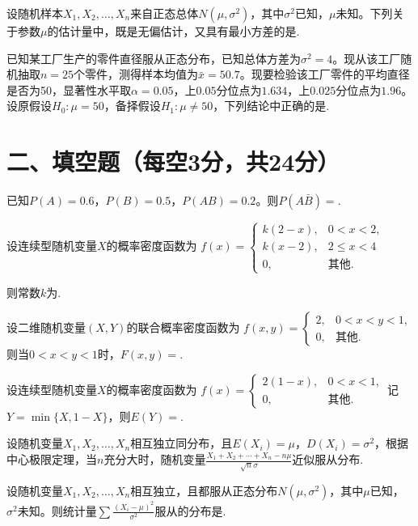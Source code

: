 \documentclass[answerspace=14]{shnu-exam}
\begin{document}
\question 设随机样本$X_1,X_2,\dots,X_n$来自正态总体$N(\mu,\sigma^2)$，其中$\sigma^2$已知，$\mu$未知。下列关于参数$\mu$的估计量中，既是无偏估计，又具有最小方差的是.

\question 已知某工厂生产的零件直径服从正态分布，已知总体方差为$\sigma^2=4$。现从该工厂随机抽取$n=25$个零件，测得样本均值为$\bar{x}=50.7$。现要检验该工厂零件的平均直径是否为50，显著性水平取$\alpha=0.05$，上$0.05$分位点为$1.634$，上$0.025$分位点为$1.96$。设原假设$H_0:\mu=50$，备择假设$H_1:\mu\neq50$，下列结论中正确的是.

\section{二、填空题（每空3分，共24分）}

\question 已知$P(A)=0.6$，$P(B)=0.5$，$P(AB)=0.2$。则$P(A\bar{B})=$.

\question 设连续型随机变量$X$的概率密度函数为
$f(x)=\begin{cases}k(2-x),&0<x<2\text{,}\\k(x-2),&2\leq x<4\\0,&\text{其他.}\end{cases}$
\par 则常数$k$为.

\question 设二维随机变量$(X,Y)$的联合概率密度函数为
$f(x,y)=\begin{cases}2,&0<x<y<1\text{,}\\0,&\text{其他.}\end{cases}$
则当$0<x<y<1$时，$F(x,y)=$.

\question 设连续型随机变量$X$的概率密度函数为
$f(x)=\begin{cases}2(1-x),&0<x<1\text{,}\\0,&\text{其他.}\end{cases}$
记$Y=\min\{X,1-X\}$，则$E(Y)=$.

\question 设随机变量$X_1,X_2,\dots,X_n$相互独立同分布，且$E(X_i)=\mu$，$D(X_i)=\sigma^2$，根据中心极限定理，当$n$充分大时，随机变量$\frac{X_1+X_2+\cdots+X_n-n\mu}{\sqrt{n}\sigma}$近似服从分布.

\question 设随机变量$X_1,X_2,\dots,X_n$相互独立，且都服从正态分布$N(\mu,\sigma^2)$，其中$\mu$已知，$\sigma^2$未知。则统计量$\sum\frac{(X_i-\mu)^2}{\sigma^2}$服从的分布是.
\end{document}
